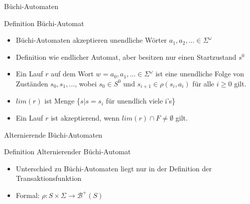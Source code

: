 
\begin{frame}{Büchi-Automaten}
\begin{block}{Definition Büchi-Automat}
\begin{itemize}
\setlength\itemsep{1em}
\item Büchi-Automaten akzeptieren unendliche Wörter $a_1,a_2,... \in \Sigma^\omega$
\item Definition wie endlicher Automat, aber besitzen nur einen Startzustand $s^0$
\pause
\item Ein Lauf $r$ auf dem Wort $w=a_0,a_1,...\in \Sigma^\omega$ ist eine unendliche Folge von Zuständen $s_0,s_1,...$, wobei $s_0\in S^0$ und $s_{i+1}\in \rho(s_i,a_i)$ für alle $i\geq0$ gilt.
\pause
\item $lim(r)$ ist Menge \{$s|s=s_i$ für unendlich viele i's\}
\item Ein Lauf $r$ ist akzeptierend, wenn $lim(r)\cap F \neq \emptyset$ gilt.
\end{itemize}
\end{block}
\end{frame}

\begin{frame}{Alternierende Büchi-Automaten}
\begin{block}{Definition Alternierender Büchi-Automat}
\begin{itemize}
\setlength\itemsep{1em}
\item Unterschied zu Büchi-Automaten liegt nur in der Definition der Transaktionsfunktion
\item Formal: $\rho: S\times \Sigma \rightarrow \mathcal{B}^+(S)$
\end{itemize}
\end{block}
\end{frame}

